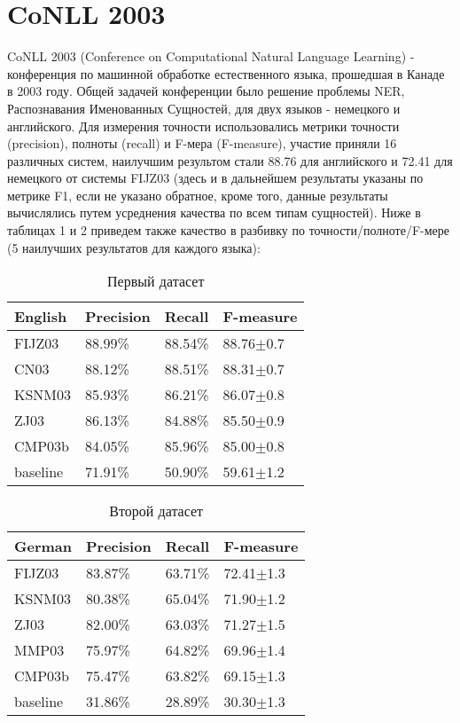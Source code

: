 \section{CoNLL 2003}

CoNLL 2003 (Conference on Computational Natural Language Learning) - конференция по машинной обработке естественного языка, прошедшая в Канаде в 2003 году. Общей задачей конференции было решение проблемы NER, Распознавания Именованных Сущностей, для двух языков - немецкого и английского. Для измерения точности использовались метрики точности (precision), полноты (recall) и F-мера (F-measure), участие приняли 16 различных систем, наилучшим результом стали 88.76 для английского и 72.41 для немецкого от системы FIJZ03 \cite{Florian:2003:NER:1119176.1119201} (здесь и в дальнейшем результаты указаны по метрике F1, если не указано обратное, кроме того, данные результаты вычислялись путем усреднения качества по всем типам сущностей). Ниже в таблицах 1 и 2 приведем также качество в разбивку по точности/полноте/F-мере (5 наилучших результатов для каждого языка):

\begin{table}[ht]
\caption{Первый датасет}
\centering
\label{first_dataset}
\begin{tabular}{|l|l|l|l|}
\hline
English      & Precision & Recall  & F-measure \\ \hline
FIJZ03       & 88.99\%   & 88.54\% & 88.76${\pm}$0.7 \\ \hline
CN03         & 88.12\%   & 88.51\% & 88.31${\pm}$0.7 \\ \hline
KSNM03       & 85.93\%   & 86.21\% & 86.07${\pm}$0.8 \\ \hline
ZJ03         & 86.13\%   & 84.88\% & 85.50${\pm}$0.9 \\ \hline
CMP03b       & 84.05\%   & 85.96\% & 85.00${\pm}$0.8 \\ \hline
baseline     & 71.91\%   & 50.90\% & 59.61${\pm}$1.2 \\ \hline
\end{tabular}
\end{table}

\begin{table}[ht]
\caption{Второй датасет}
\centering
\label{second_dataset}
\begin{tabular}{|l|l|l|l|}
\hline
German      & Precision & Recall  & F-measure \\ \hline
FIJZ03      & 83.87\%   & 63.71\% & 72.41${\pm}$1.3 \\ \hline
KSNM03      & 80.38\%   & 65.04\% & 71.90${\pm}$1.2 \\ \hline
ZJ03        & 82.00\%   & 63.03\% & 71.27${\pm}$1.5 \\ \hline
MMP03       & 75.97\%   & 64.82\% & 69.96${\pm}$1.4 \\ \hline
CMP03b      & 75.47\%   & 63.82\% & 69.15${\pm}$1.3 \\ \hline
baseline    & 31.86\%   & 28.89\% & 30.30${\pm}$1.3 \\ \hline
\end{tabular}
\end{table}

